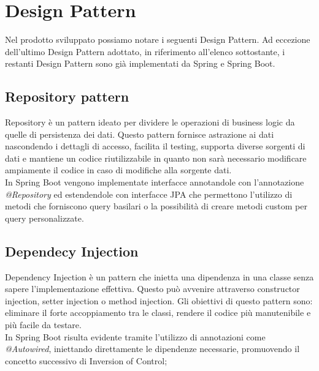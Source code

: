 \section{Design Pattern}
\label{cap:design pattern}
Nel prodotto sviluppato possiamo notare i seguenti Design Pattern.
Ad eccezione dell'ultimo Design Pattern adottato, in riferimento all'elenco sottostante, i restanti Design Pattern sono già implementati da Spring e Spring Boot.
\subsection*{Repository pattern}
Repository è un pattern ideato per dividere le operazioni di business logic da quelle di persistenza dei dati. Questo pattern fornisce astrazione ai dati nascondendo i dettagli di accesso, facilita il testing, supporta diverse sorgenti di dati e mantiene un codice riutilizzabile in quanto non sarà necessario modificare ampiamente il codice in caso di modifiche alla sorgente dati.\\
In Spring Boot vengono implementate interfacce annotandole con  l'annotazione \textit{@Repository} ed estendendole con interfacce JPA che permettono l'utilizzo di metodi che forniscono query basilari o la possibilità di creare metodi custom per query personalizzate.
\subsection*{Dependecy Injection}
Dependency Injection è un pattern che inietta una dipendenza in una classe senza sapere l'implementazione effettiva. Questo può avvenire attraverso constructor injection, setter injection o method injection. Gli obiettivi di questo pattern sono: eliminare il forte accoppiamento tra le classi, rendere il codice più manutenibile e più facile da testare.\\
In Spring Boot risulta evidente tramite l'utilizzo di annotazioni come \textit{@Autowired}, iniettando direttamente le dipendenze necessarie, promuovendo il concetto successivo di Inversion of Control;
